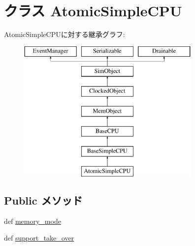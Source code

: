 \hypertarget{classAtomicSimpleCPU_1_1AtomicSimpleCPU}{
\section{クラス AtomicSimpleCPU}
\label{classAtomicSimpleCPU_1_1AtomicSimpleCPU}
}
AtomicSimpleCPUに対する継承グラフ:\begin{figure}[H]
\begin{center}
\leavevmode
\includegraphics[height=7cm]{classAtomicSimpleCPU_1_1AtomicSimpleCPU}
\end{center}
\end{figure}
\subsection*{Public メソッド}
\begin{DoxyCompactItemize}
\item 
def \hyperlink{classAtomicSimpleCPU_1_1AtomicSimpleCPU_a53d73a2f804df6a1dcabb22052d09773}{memory\_\-mode}
\item 
def \hyperlink{classAtomicSimpleCPU_1_1AtomicSimpleCPU_aa201537acf29724056129b8efad43371}{support\_\-take\_\-over}
\end{DoxyCompactItemize}
